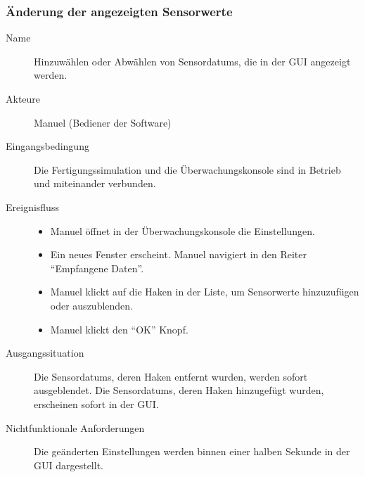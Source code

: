 \documentclass[parskip=full]{scrartcl}
\begin{document}
\subsubsection{Änderung der angezeigten Sensorwerte}
\begin{description}
 \item[Name] Hinzuwählen oder Abwählen von \glspl{Sensordatum}, die in der \gls{GUI} angezeigt werden.
 \item[Akteure] Manuel (Bediener der Software)
 \item[Eingangsbedingung] Die Fertigungssimulation und die Überwachungskonsole sind in Betrieb und miteinander verbunden.
 \item[Ereignisfluss]
 \begin{itemize}[noitemsep]
  \item Manuel öffnet in der Überwachungskonsole die Einstellungen.
  \item Ein neues Fenster erscheint. Manuel navigiert in den Reiter ``Empfangene Daten''.
  \item Manuel klickt auf die Haken in der Liste, um Sensorwerte hinzuzufügen oder auszublenden.
  \item Manuel klickt den ``OK'' Knopf.
 \end{itemize}
 \item[Ausgangssituation] Die \glspl{Sensordatum}, deren Haken entfernt wurden, werden sofort ausgeblendet. Die \glspl{Sensordatum}, deren Haken hinzugefügt wurden, erscheinen sofort in der \gls{GUI}.
 \item [Nichtfunktionale Anforderungen] Die geänderten Einstellungen werden binnen einer halben Sekunde in der \gls{GUI} dargestellt.
\end{description}
\end{document}
